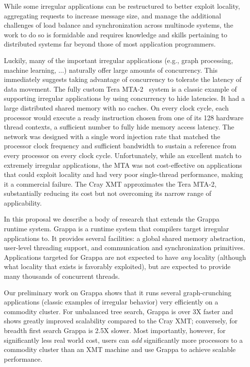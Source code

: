 While some irregular applications can be restructured to better exploit locality, aggregating requests to increase message size, and manage the additional challenges of load balance and synchronization across multinode systems, the work to do so is formidable and requires knowledge and skills pertaining to distributed systems far beyond those of most application programmers.

Luckily, many of the important irregular applications (e.g., graph processing, machine learning, ...) naturally offer large amounts of concurrency. This immediately suggests taking advantage of concurrency to tolerate the latency of data movement. The fully custom Tera MTA-2~\cite{tera:mta1} system is a classic example of supporting irregular applications by using concurrency to hide latencies. It had a large distributed shared memory with no caches.  On every clock cycle, each processor would execute a ready instruction chosen from one of its 128 hardware thread contexts, a sufficient number to fully hide memory access latency.  The network was designed with a single word injection rate that matched the processor clock frequency and sufficient bandwidth to sustain a reference from every processor on every clock cycle. Unfortunately, while an excellent match to extremely irregular applications, the MTA was not cost-effective on applications that could exploit locality and had very poor single-thread performance, making it a commercial failure. The Cray XMT approximates the Tera MTA-2, substantially reducing its cost but not overcoming its narrow range of applicability.

In this proposal we describe a body of research that extends the Grappa~\cite{grappa} runtime system.  Grappa is a runtime system that compilers target irregular applications to.  It provides several facilities: a global shared memory abstraction, user-level threading support, and communication and synchronization primitives.  Applications targeted for Grappa are not expected to have \emph{any} locality (although what locality that exists is favorably exploited), but are expected to provide many thousands of concurrent threads.  

Our preliminary work on Grappa shows that it runs several graph-crunching applications (classic examples of irregular behavior) very efficiently on a commodity cluster.  For unbalanced tree search, Grappa is over 3X faster and shows greatly improved scalability compared to the Cray XMT; conversely, for breadth first search Grappa is 2.5X slower.  Most importantly, however, for significantly less real world cost, users can \emph{add} significantly more processors to a commodity cluster than an XMT machine and use Grappa to achieve scalable performance.

